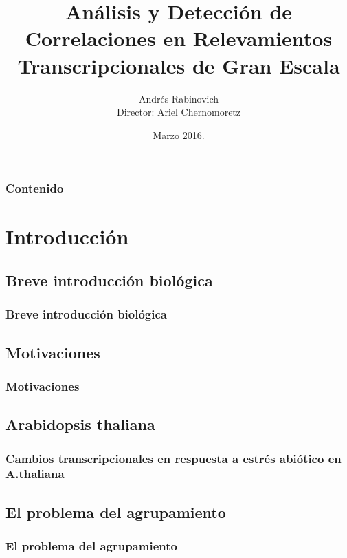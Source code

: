 \documentclass[serif,9pt]{beamer}
\newif\ifplacelogo %
\begin{document}
\title[Análisis y Detección de Correlaciones en Relevamien\ldots ]{Análisis y Detección de Correlaciones en Relevamientos Transcripcionales de Gran Escala}  
\author[Andrés Rabinovich]{Andrés Rabinovich\\{\small Director: Ariel Chernomoretz}}

\date{Marzo 2016.}


\begin{frame}
\titlepage
\end{frame}

\placelogofalse

\begin{frame}
\frametitle{Contenido}
\tableofcontents
\end{frame} 

\section{Introducción} 

\subsection{Breve introducción biológica}
\begin{frame}
\frametitle{Breve introducción biológica} 
\end{frame}

\subsection{Motivaciones}
\begin{frame}
\frametitle{Motivaciones} 
\end{frame}

\subsection{Arabidopsis thaliana}
\begin{frame}
\frametitle{Cambios transcripcionales en respuesta a estrés abiótico en A.thaliana} 
\end{frame}


\subsection{El problema del agrupamiento}
\begin{frame}
\frametitle{El problema del agrupamiento} 
\end{frame}
\end{document}
